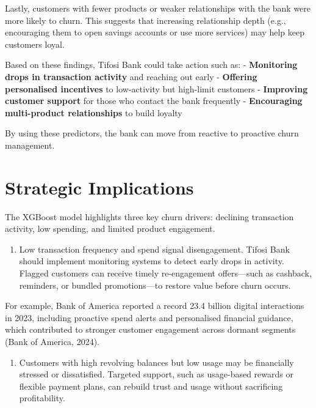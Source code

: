 \documentclass[
  letterpaper,
  DIV=11,
  numbers=noendperiod]{scrartcl}
\providecommand{\tightlist}{%
  \setlength{\itemsep}{0pt}\setlength{\parskip}{0pt}}\usepackage{longtable,booktabs,array}
\begin{document}
Lastly, customers with fewer products or weaker relationships with the
bank were more likely to churn. This suggests that increasing
relationship depth (e.g., encouraging them to open savings accounts or
use more services) may help keep customers loyal.

Based on these findings, Tifosi Bank could take action such as: -
\textbf{Monitoring drops in transaction activity} and reaching out early
- \textbf{Offering personalised incentives} to low-activity but
high-limit customers - \textbf{Improving customer support} for those who
contact the bank frequently - \textbf{Encouraging multi-product
relationships} to build loyalty

By using these predictors, the bank can move from reactive to proactive
churn management.

\section{Strategic Implications}\label{strategic-implications}

The XGBoost model highlights three key churn drivers: declining
transaction activity, low spending, and limited product engagement.

\begin{enumerate}
\def\labelenumi{\arabic{enumi}.}
\tightlist
\item
  Low transaction frequency and spend signal disengagement. Tifosi Bank
  should implement monitoring systems to detect early drops in activity.
  Flagged customers can receive timely re-engagement offers---such as
  cashback, reminders, or bundled promotions---to restore value before
  churn occurs.
\end{enumerate}

For example, Bank of America reported a record 23.4 billion digital
interactions in 2023, including proactive spend alerts and personalised
financial guidance, which contributed to stronger customer engagement
across dormant segments (Bank of America, 2024).

\begin{enumerate}
\def\labelenumi{\arabic{enumi}.}
\setcounter{enumi}{1}
\tightlist
\item
  Customers with high revolving balances but low usage may be
  financially stressed or dissatisfied. Targeted support, such as
  usage-based rewards or flexible payment plans, can rebuild trust and
  usage without sacrificing profitability.
\end{enumerate}
\end{document}
